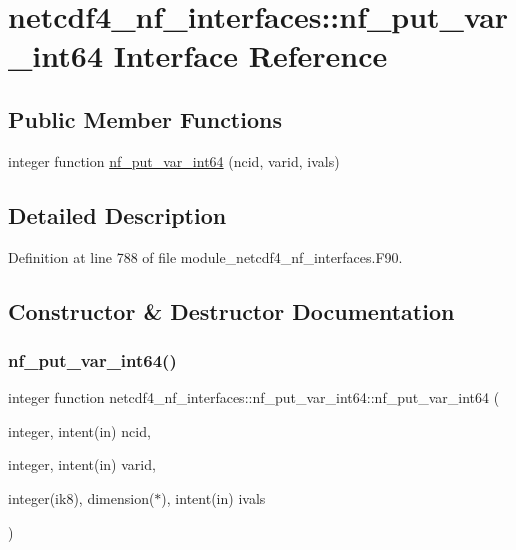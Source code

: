 \hypertarget{interfacenetcdf4__nf__interfaces_1_1nf__put__var__int64}{}\section{netcdf4\+\_\+nf\+\_\+interfaces\+:\+:nf\+\_\+put\+\_\+var\+\_\+int64 Interface Reference}
\label{interfacenetcdf4__nf__interfaces_1_1nf__put__var__int64}
\subsection*{Public Member Functions}
\begin{DoxyCompactItemize}
\item 
integer function \hyperlink{interfacenetcdf4__nf__interfaces_1_1nf__put__var__int64_a62c6de088a855a4555f1ce84a41dce59}{nf\+\_\+put\+\_\+var\+\_\+int64} (ncid, varid, ivals)
\end{DoxyCompactItemize}


\subsection{Detailed Description}


Definition at line 788 of file module\+\_\+netcdf4\+\_\+nf\+\_\+interfaces.\+F90.



\subsection{Constructor \& Destructor Documentation}
\mbox{\label{interfacenetcdf4__nf__interfaces_1_1nf__put__var__int64_a62c6de088a855a4555f1ce84a41dce59}} 
\subsubsection{\texorpdfstring{nf\+\_\+put\+\_\+var\+\_\+int64()}{nf\_put\_var\_int64()}}
{\footnotesize\ttfamily integer function netcdf4\+\_\+nf\+\_\+interfaces\+::nf\+\_\+put\+\_\+var\+\_\+int64\+::nf\+\_\+put\+\_\+var\+\_\+int64 (\begin{DoxyParamCaption}\item[{integer, intent(in)}]{ncid,  }\item[{integer, intent(in)}]{varid,  }\item[{integer(ik8), dimension($\ast$), intent(in)}]{ivals }\end{DoxyParamCaption})}



